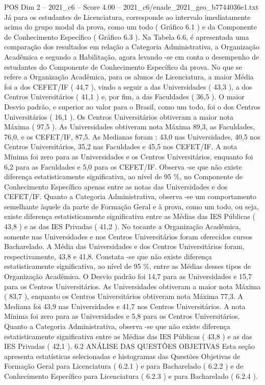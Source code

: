\begin{textsample}{POS Dim 2 – 2021\_c6 – Score 4.00 – 2021\_c6/enade\_2021\_geo\_b7744036e1.txt}
Já para os estudantes de Licenciatura, corresponde ao intervalo imediatamente acima do grupo modal da prova, como um todo ( Gráfico 6.1 ) e da Componente de Conhecimento Específico ( Gráfico 6.3 ).
Na Tabela 6.6, é apresentada uma comparação dos resultados em relação a Categoria Administrativa, a Organização Acadêmica e segundo a Habilitação, agora levando -se em conta o desempenho de estudantes do Componente de Conhecimento Específico da prova.
No que se refere a Organização Acadêmica, para os alunos de Licenciatura, a maior Média foi a dos CEFET/IF ( 44,7 ), vindo a seguir a das Universidades ( 43,3 ), a dos Centros Universitários ( 41,1 ) e, por fim, a das Faculdades ( 36,5 ).
O maior Desvio padrão, e superior ao valor para o Brasil, como um todo, foi o dos Centros Universitários ( 16,1 ).
Os Centros Universitários obtiveram a maior nota Máxima ( 97,5 ).
As Universidades obtiveram nota Máxima 89,3, as Faculdades, 76,0, e os CEFET/IF, 87,5.
As Medianas foram : 43,0 nas Universidades, 40,5 nos Centros Universitários, 35,2 nas Faculdades e 45,5 nos CEFET/IF.
A nota Mínima foi zero para as Universidades e os Centros Universitários, enquanto foi 6,2 para as Faculdades e 5,0 para os CEFET/IF.
Observa -se que não existe diferença estatisticamente significativa, ao nível de 95 \%, no Componente de Conhecimento Específico apenas entre as notas das Universidades e dos CEFET/IF.
Quanto a Categoria Administrativa, observa -se um comportamento semelhante àquele da parte de Formação Geral e à prova, como um todo, ou seja, existe diferença estatisticamente significativa entre as Médias das IES Públicas ( 43,8 ) e as das IES Privadas ( 41,2 ).
No tocante a Organização Acadêmica, somente nas Universidades e nos Centros Universitários foram oferecidos cursos Bacharelado.
A Média das Universidades e dos Centros Universitários foram, respectivamente, 43,8 e 41,8.
Constata -se que não existe diferença estatisticamente significativa, ao nível de 95 \%, entre as Médias desses tipos de Organização Acadêmica.
O Desvio padrão foi 14,7 para as Universidades e 15,7 para os Centros Universitários.
As Universidades obtiveram a maior nota Máxima ( 83,7 ), enquanto os Centros Universitários obtiveram nota Máxima 77,3.
A Mediana foi 43,9 nas Universidades e 41,7 nos Centros Universitários.
A nota Mínima foi zero para as Universidades e 5,8 para os Centros Universitários.
Quanto a Categoria Administrativa, observa -se que não existe diferença estatisticamente significativa entre as Médias das IES Públicas ( 43,8 ) e as das IES Privadas ( 42,1 ). 6.2 ANÁLISE DAS QUESTÕES OBJETIVAS Esta seção apresenta estatísticas selecionadas e histogramas das Questões Objetivas de Formação Geral para Licenciatura ( 6.2.1 ) e para Bacharelado ( 6.2.2 ) e de Conhecimento Específico para Licenciatura ( 6.2.3 ) e para Bacharelado ( 6.2.4 ).

\end{textsample}
